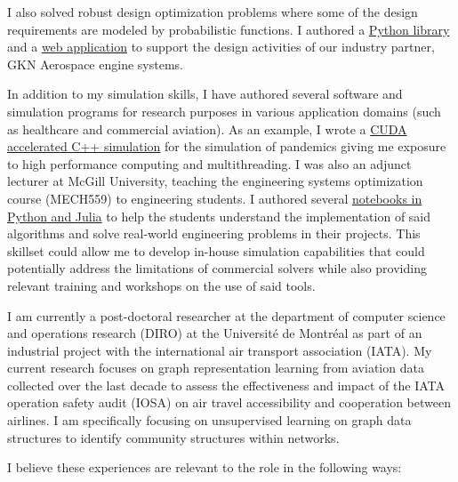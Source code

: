 \documentclass[12pt]{article} %
\begin{document}
\medskip %

I also solved robust design optimization problems where some of the design requirements are modeled by probabilistic functions. I authored a \href{https://sed-group.github.io/mvmlib/index.html}{Python library} and a \href{https://github.com/khbalhandawi/scale_AM_webapp}{web application} to support the design activities of our industry partner, GKN Aerospace engine systems.

\medskip %

In addition to my simulation skills, I have authored several software and simulation programs for research purposes in various application domains (such as healthcare and commercial aviation). As an example, I wrote a \href{https://github.com/khbalhandawi/COVID_SIM_GPU}{CUDA accelerated C++ simulation} for the simulation of pandemics giving me exposure to high performance computing and multithreading. I was also an adjunct lecturer at McGill University, teaching the engineering systems optimization course (MECH559) to engineering students. I authored several \href{https://github.com/khbalhandawi/MECH559_notebooks}{notebooks in Python and Julia} to help the students understand the implementation of said algorithms and solve real-world engineering problems in their projects. This skillset could allow me to develop in-house simulation capabilities that could potentially address the limitations of commercial solvers while also providing relevant training and workshops on the use of said tools.

\medskip %

I am currently a post-doctoral researcher at the department of computer science and operations research (DIRO) at the Universit\'{e} de Montr\'{e}al as part of an industrial project with the international air transport association (IATA). My current research focuses on graph representation learning from aviation data collected over the last decade to assess the effectiveness and impact of the IATA operation safety audit (IOSA) on air travel accessibility and cooperation between airlines. I am specifically focusing on unsupervised learning on graph data structures to identify community structures within networks.

\medskip %

I believe these experiences are relevant to the role in the following ways: 
\end{document}
